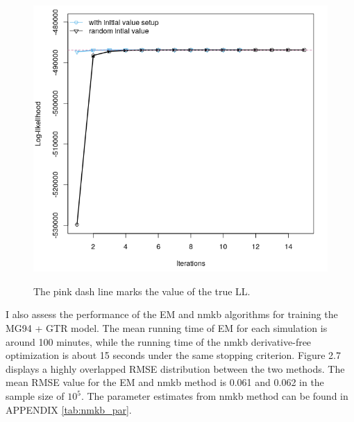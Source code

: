 \begin{figure}[H]
     \begin{minipage}[t]{1\textwidth }
     \centering
     \includegraphics[width=\linewidth]{Fig6.png}
     {{The pink dash line marks the value of the true LL. }
     \par}
     \end{minipage}
\end{figure}

\indent I also assess the performance of the EM and nmkb algorithms for training the MG94 + GTR model. The mean running time of EM for each simulation is around 100 minutes, while the running time of the nmkb derivative-free optimization is about 15 seconds under the same stopping criterion. Figure 2.7 displays a highly overlapped RMSE distribution between the two methods. The mean RMSE value for the EM and nmkb method is 0.061 and 0.062 in the sample size of $10^5$. The parameter estimates from nmkb method can be found in APPENDIX \ref{tab:nmkb_par}. 

